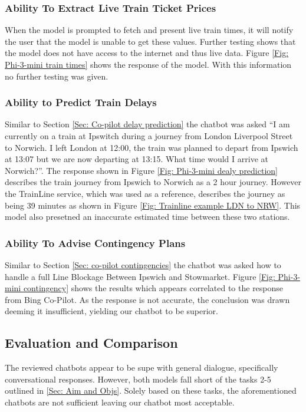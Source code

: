 \subsubsection{Ability To Extract Live Train Ticket Prices}
When the model is prompted to fetch and present live train times, it will notify the user that the model is unable to get these values. Further testing shows that the model does not have access to the internet and thus live data. Figure \ref{Fig: Phi-3-mini train times} shows the response of the model. With this information no further testing was given.

\subsubsection{Ability to Predict Train Delays}
Similar to Section \ref{Sec: Co-pilot delay prediction} the chatbot was asked ``I am currently on a train at Ipswitch during a journey from London Liverpool Street to Norwich. I left London at 12:00, the train was planned to depart from Ipswich at 13:07 but we are now departing at 13:15. What time would I arrive at Norwich?''. The response shown in Figure \ref{Fig: Phi-3-mini dealy prediction} describes the train journey from Ipswich to Norwich as a 2 hour journey. However the TrainLine service, which was used as a reference, describes the journey as being 39 minutes as shown in Figure \ref{Fig: Trainline example LDN to NRW}. This model also presetned an inaccurate estimated time between these two stations.

\subsubsection{Ability To Advise Contingency Plans}
Similar to Section \ref{Sec: co-pilot contingencies} the chatbot was asked how to handle a full Line Blockage Between Ipswich and Stowmarket. Figure \ref{Fig: Phi-3-mini contingency} shows the results which appears correlated to the response from Bing Co-Pilot. As the response is not accurate, the conclusion was drawn deeming it insufficient, yielding our chatbot to be superior. 


\subsection{Evaluation and Comparison}
The reviewed chatbots appear to be supe with general dialogue, specifically conversational responses. However, both models fall short of the tasks 2-5 outlined in \ref{Sec: Aim and Objs}. Solely based on these tasks, the aforementioned chatbots are not sufficient leaving our chatbot most acceptable.